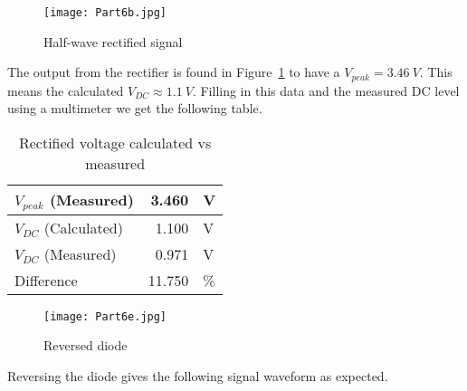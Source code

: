 \documentclass{article}
\begin{document}
\clearpage

\begin{figure}[h] %
\centering
\texttt{[image: Part6b.jpg]}
\caption{Half-wave rectified signal}
\label{fig:Part6b}
\end{figure}

The output from the rectifier is found in Figure~\ref{fig:Part6b} to have a \(V_{peak} = \SI{3,46}{V}\). This means the calculated \(V_{DC} \approx \SI{1,1}{V}\). Filling in this data and the measured DC level using a multimeter we get the following table.

\vspace{1em}

\begin{table}[htbp] %
  \centering
  \caption{Rectified voltage calculated vs measured}
    \begin{tabular}{|l|rl|}
    \hline
    \(V_{peak}\) (Measured) & 3.460 & V \bigstrut\\
    \hline
    \(V_{DC}\) (Calculated) & 1.100 & V \bigstrut\\
    \hline
    \(V_{DC}\) (Measured) & 0.971 & V \bigstrut\\
    \hline
    Difference & 11.750 & \% \bigstrut\\
    \hline
    \end{tabular}%
  \label{tab:part6}%
\end{table}%

\clearpage

\begin{figure}[h] %
\centering
\texttt{[image: Part6e.jpg]}
\caption{Reversed diode}
\label{fig:Part6e}
\end{figure}

Reversing the diode gives the following signal waveform as expected.

\end{document}
